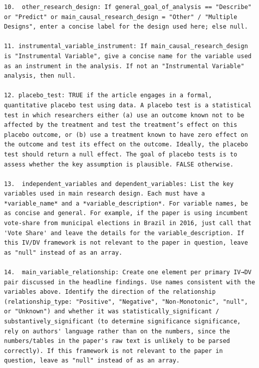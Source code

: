 \documentclass[12pt]{article}
\begin{document}
{\begin{Verbatim}[breaklines=true]
10.  other_research_design: If general_goal_of_analysis == "Describe" or "Predict" or main_causal_research_design = "Other" / "Multiple Designs", enter a concise label for the design used here; else null.

11. instrumental_variable_instrument: If main_causal_research_design is "Instrumental Variable", give a concise name for the variable used as an instrument in the analysis. If not an "Instrumental Variable" analysis, then null.

12. placebo_test: TRUE if the article engages in a formal, quantitative placebo test using data. A placebo test is a statistical test in which researchers either (a) use an outcome known not to be affected by the treatment and test the treatment’s effect on this placebo outcome, or (b) use a treatment known to have zero effect on the outcome and test its effect on the outcome. Ideally, the placebo test should return a null effect. The goal of placebo tests is to assess whether the key assumption is plausible. FALSE otherwise. 

13.  independent_variables and dependent_variables: List the key variables used in main research design. Each must have a *variable_name* and a *variable_description*. For variable names, be as concise and general. For example, if the paper is using incumbent vote-share from municipal elections in Brazil in 2016, just call that 'Vote Share' and leave the details for the variable_description. If this IV/DV framework is not relevant to the paper in question, leave as "null" instead of as an array.

14.  main_variable_relationship: Create one element per primary IV→DV pair discussed in the headline findings. Use names consistent with the variables above. Identify the direction of the relationship (relationship_type: "Positive", "Negative", "Non-Monotonic", "null", or "Unknown") and whether it was statistically_significant / substantively_significant (to determine significance significance, rely on authors' language rather than on the numbers, since the numbers/tables in the paper's raw text is unlikely to be parsed correctly). If this framework is not relevant to the paper in question, leave as "null" instead of as an array.


\end{Verbatim}}
\end{document}
